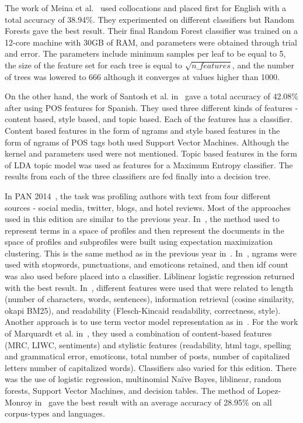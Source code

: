 \documentclass[a4paper]{llncs}
\begin{document}
The work of Meina et al.~\cite{meina2013ensemble} used collocations and placed first for English with a total accuracy of 38.94\%. They experimented on different classifiers but Random Forests gave the best result. Their final Random Forest classifier was trained on a 12-core machine with 30GB of RAM, and parameters were obtained through trial and error. The parameters include minimum samples per leaf to be equal to 5, the size of the feature set for each tree is equal to $\sqrt{n\_features}$, and the number of trees was lowered to 666 although it converges at values higher than 1000.  


On the other hand, the work of Santosh et al. in~\cite{santosh2013author} gave a total accuracy of 42.08\% after using POS features for Spanish. They used three different kinds of features - content based, style based, and topic based. Each of the features has a classifier. Content based features in the form of ngrams and style based features in the form of ngrams of POS tags both used Support Vector Machines. Although the kernel and parameters used were not mentioned. Topic based features in the form of LDA topic model was used as features for a Maximum Entropy classifier. The results from each of the three classifiers are fed finally into a decision tree. 

In PAN 2014~\cite{rangel2014overview}, the task was profiling authors with text from four different sources - social media, twitter, blogs, and hotel reviews. Most of the approaches used in this edition are similar to the previous year. In~\cite{lopezusing}, the method used to represent terms in a space of profiles and then represent the documents in the space of profiles and subprofiles were built using expectation maximization clustering. This is the same method as in the previous year in~\cite{lopez2013inaoe}. In~\cite{maharjansimple}, ngrams were used with stopwords, punctuations, and emoticons retained, and then idf count was also used before placed into a classifier. Liblinear logistic regression returned with the best result. In~\cite{weren6exploring}, different features were used that were related to length (number of characters, words, sentences), information retrieval (cosine similarity, okapi BM25), and readability (Flesch-Kincaid readability, correctness, style). Another approach is to use term vector model representation as in~\cite{villenadaedalus}. For the work of Marquardt et al. in~\cite{marquardt2014age}, they used a combination of content-based features (MRC, LIWC, sentiments) and stylistic features (readability, html tags, spelling and grammatical error, emoticons, total number of posts, number of capitalized letters number of capitalized words). Classifiers also varied for this edition. There was the use of logistic regression, multinomial Naïve Bayes, liblinear, random forests, Support Vector Machines, and decision tables. The method of Lopez-Monroy in~\cite{lopezusing} gave the best result with an average accuracy of 28.95\% on all corpus-types and languages. 
\end{document}
